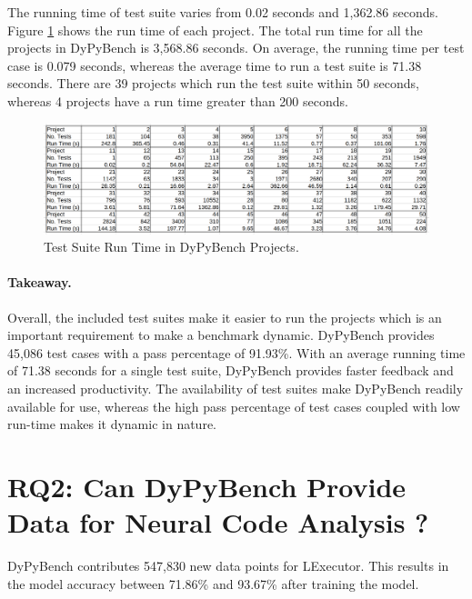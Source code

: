 The running time of test suite varies from 0.02 seconds and 1,362.86 seconds.
Figure \ref{fig:test_run_times} shows the run time of each project.
The total run time for all the projects in DyPyBench is 3,568.86 seconds.
On average, the running time per test case is 0.079 seconds, whereas the average time to run a test suite is 71.38 seconds. 
There are 39 projects which run the test suite within 50 seconds, whereas 4 projects have a run time greater than 200 seconds.
\begin{figure}[ht]
    \centering
    \includegraphics[width=1\linewidth]{figures/evaluation/tests_runtime2.png}
    \caption[Test Suite Run Time]{\label{fig:test_run_times}Test Suite Run Time in DyPyBench Projects.}
\end{figure}

\paragraph{Takeaway.} Overall, the included test suites make it easier to run the projects which is an important requirement to make a benchmark dynamic.
DyPyBench provides 45,086 test cases with a pass percentage of 91.93\%. 
With an average running time of 71.38 seconds for a single test suite, DyPyBench provides faster feedback and an increased productivity.
The availability of test suites make DyPyBench readily available for use, whereas the high pass percentage of test cases coupled with low run-time makes it dynamic in nature.

\section{RQ2: Can DyPyBench Provide Data for Neural Code Analysis ?}
DyPyBench contributes 547,830 new data points for LExecutor. 
This results in the model accuracy between 71.86\% and 93.67\% after training the model.

